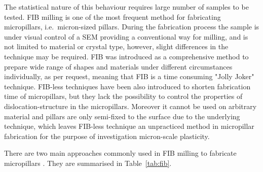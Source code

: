 The statistical nature of this behaviour requires large number of samples to be tested. FIB milling \cite{0960-1317-11-4-301} is one of the most frequent method for fabricating micropillars, i.e.\ micron-sized pillars. During the fabrication process the sample is under visual control of a SEM providing a conventional way for milling, and is not limited to material or crystal type, however, slight differences in the technique may be required. FIB was introduced as a comprehensive method to prepare wide range of shapes and materials under different circumstances individually, as per request, meaning that FIB is a time consuming "Jolly Joker" technique. FIB-less techniques have been also introduced \cite{doi:10.1021/nl902872w,PhysRevLett.104.135503} to shorten fabrication time of micropillars, but they lack the possibility to control the properties of dislocation-structure in the micropillars. Moreover it cannot be used on arbitrary material and pillars are only semi-fixed to the surface due to the underlying technique, which leaves FIB-less technique an unpracticed method in micropillar fabrication for the purpose of investigation micron-scale plasticity.

There are two main approaches commonly used in FIB milling to fabricate micropillars \cite{HUTSCH201449}. They are summarised in Table~\ref{tab:fib}.

